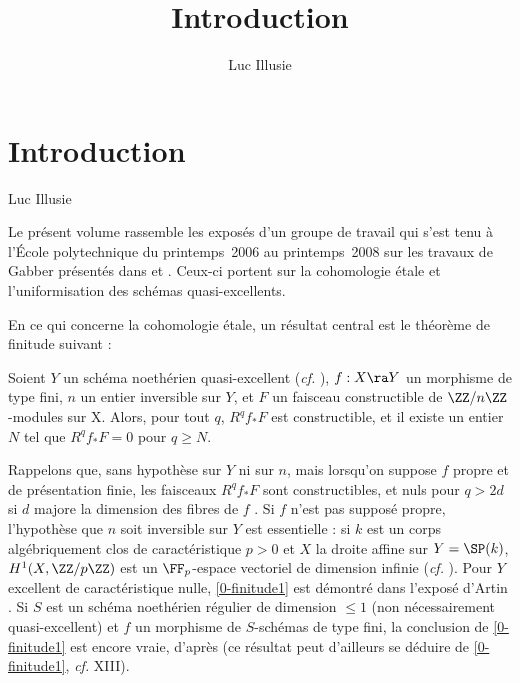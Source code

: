 \documentclass[10pt]{../fichiers-configuration-latex/smfart}
\author{Luc Illusie}
\title{Introduction}
\begin{document}
\maketitle

\else
{}
\chapter{Introduction}
\begin{center}
Luc Illusie
\end{center}
\fi

\renewcommand\thesubsection{\textbf{\arabic{subsection}}}

Le présent volume rassemble les exposés d'un groupe de travail qui s'est tenu à l'École
polytechnique du printemps 2006 au printemps 2008 sur les travaux de Gabber présentés dans
\cite{Conference-Illusie@Gabber} et \cite{Conference-Deligne@Gabber}. Ceux-ci portent sur la
cohomologie étale et l'uniformisation des schémas quasi-excellents. 

En ce qui concerne la cohomologie étale, un résultat central est le théorème de finitude suivant :

\begin{theoreme}\label{0-finitude1} Soient $Y$ un schéma noethérien quasi-excellent (\textit{cf.}
), $f : X \ra Y$ un morphisme de type fini, $n$ un entier inversible sur
$Y$, et $F$ un faisceau constructible de $\ZZ/n\ZZ$-modules sur X. Alors, pour tout $q$, $R^qf_*F$
est constructible, et il existe un entier $N$ tel que $R^qf_*F = 0$ pour $q \ge N$.  \end{theoreme} 

Rappelons que, sans hypothèse sur $Y$ ni sur $n$, mais lorsqu'on suppose $f$ propre et de
présentation finie, les faisceaux $R^qf_*F$ sont constructibles, et nuls pour $q > 2d$ si $d$ majore
la dimension des fibres de $f$ . Si $f$ n'est pas supposé propre, l'hypothèse que
$n$ soit inversible sur $Y$ est essentielle : si $k$ est un corps algébriquement clos de
caractéristique $p >0$ et $X$ la droite affine sur $Y = \SP(k)$, $H^1(X,\ZZ/p\ZZ)$ est un
$\FF_p$-espace vectoriel de dimension infinie (\textit{cf.} ). Pour $Y$ excellent
de caractéristique nulle, \ref{0-finitude1} est démontré dans l'exposé d'Artin . Si
$S$ est un schéma noethérien régulier de dimension $\le 1$ (non nécessairement quasi-excellent) et
$f$ un morphisme de $S$-schémas de type fini,  la conclusion de \ref{0-finitude1} est encore vraie,
d'après  (ce résultat peut d'ailleurs se déduire de
\ref{0-finitude1}, \textit{cf.} XIII).  
\end{document}
